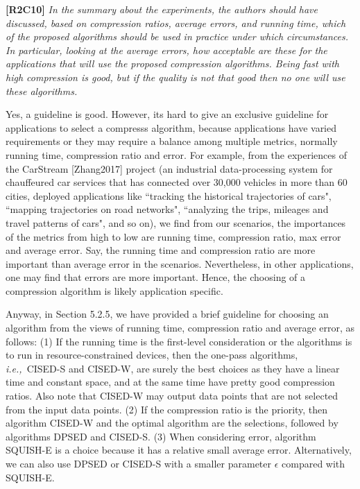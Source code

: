 \documentclass{letter}
\newcommand{\ie}{\emph{i.e.,}\xspace}
\begin{document}
\textbf{[R2C10]} \emph{In the summary about the experiments, the authors should have discussed, based on compression ratios, average errors, and running time, which of the proposed algorithms should be used in practice under which circumstances. In particular, looking at the average errors, how acceptable are these for the applications that will use the proposed compression algorithms. Being fast with high compression is good, but if the quality is not that good then no one will use these algorithms.}

Yes, a guideline is good. However, its hard to give an exclusive guideline for applications to select a compresss algorithm, because applications have varied requirements or they may require a balance among multiple metrics, normally running time, compression ratio and  error. For example, from the experiences of the CarStream [Zhang2017] project (an industrial data-processing system for chauffeured car services that has connected over 30,000 vehicles in more than 60 cities, deployed applications like ``tracking the historical trajectories of cars", ``mapping trajectories on road networks", ``analyzing the trips, mileages and travel patterns of cars", and so on), we find from our scenarios,  the importances of the metrics from high to low are running time, compression ratio, max error and average error. Say, the running time and compression ratio are more important than average error in the scenarios.
Nevertheless, in other applications, one may find that errors are more important.
Hence, the choosing of a compression algorithm is likely application specific.

Anyway, in Section 5.2.5, we have provided a brief guideline for choosing an algorithm from the views of running time, compression ratio and average error, as follows: 
(1) If the running time is the first-level consideration or the algorithms is to run in resource-constrained devices, then the one-pass algorithms, \ie~CISED-S and CISED-W, are surely the best choices as they have a linear time and constant space, and at the same time have pretty good compression ratios. Also note that CISED-W may output data points that are not selected from the input data points.
%
(2) If the compression ratio is the priority, then algorithm CISED-W and the optimal algorithm are the selections, followed by algorithms DPSED and CISED-S.
%
(3) When considering error, algorithm SQUISH-E is a choice because it has a relative small average error. Alternatively, we can also use DPSED or CISED-S with a smaller parameter $\epsilon$ compared with SQUISH-E.
\end{document}
